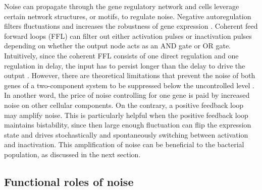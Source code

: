 Noise can propagate through the gene regulatory network and cells leverage
certain network structures, or motifs, to regulate noise.
Negative autoregulation filters fluctuations and increases the robustness
of gene expression \cite{becskei00}.
Coherent feed forward loops (FFL) can filter out either activation pulses or
inactivation pulses depending on whether the output node acts as an
AND gate or OR gate.
Intuitively, since the coherent FFL consists of one direct regulation and 
one regulation in delay, the input has to persist longer than the delay to
drive the output \cite{alon06}.
However, there are theoretical limitations that prevent the noise of
both genes of a two-component system to be suppressed below the 
uncontrolled level \cite{yan19}.
In another word, the price of noise controlling for one gene
is paid by increased noise on other cellular components.
On the contrary, a positive feedback loop may amplify noise. This is 
particularly helpful when the positive feedback loop maintains bistability,
since then large enough fluctuation can flip the expression state
and drives stochastically and spontaneously switching between
activation and inactivation.
This amplification of noise can be beneficial to the bacterial 
population, as discussed in the next section.

\subsection{Functional roles of noise}
\label{sec:functional_role_noise}

